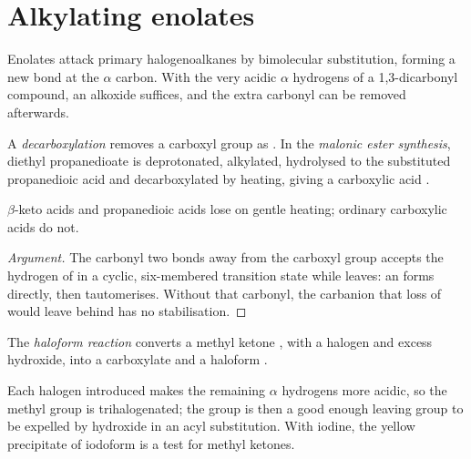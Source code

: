 \section{Alkylating enolates}

Enolates attack primary halogenoalkanes by bimolecular substitution, forming a new  bond at
the $\alpha$ carbon. With the very acidic $\alpha$ hydrogens of a 1,3-dicarbonyl compound, an alkoxide
suffices, and the extra carbonyl can be removed afterwards.

\begin{definition}[Decarboxylation]\label{def:b2:enolates-aldol:decarboxylation}
A \emph{decarboxylation} removes a carboxyl group as . In the
\emph{malonic ester synthesis}, diethyl propanedioate is deprotonated,
alkylated, hydrolysed to the substituted propanedioic acid and decarboxylated by heating, giving a
carboxylic acid .
\end{definition}

\begin{proposition}\label{prop:b2:enolates-aldol:decarboxylation}
$\beta$-keto acids and propanedioic acids lose  on gentle heating; ordinary carboxylic acids
do not.
\end{proposition}

\begin{proof}[Argument]
The carbonyl two bonds away from the carboxyl group accepts the hydrogen of  in a cyclic,
six-membered transition state while  leaves: an  forms directly, then tautomerises. Without
that carbonyl, the carbanion that loss of  would leave behind has no stabilisation.
\end{proof}

\begin{definition}\label{def:b2:enolates-aldol:haloform}
The \emph{haloform reaction} converts a methyl ketone , with a
halogen and excess hydroxide, into a carboxylate  and a haloform .
\end{definition}

Each halogen introduced makes the remaining $\alpha$ hydrogens more acidic, so the methyl group is
trihalogenated; the  group is then a good enough leaving group to be expelled by hydroxide in an
acyl substitution. With iodine, the yellow precipitate of iodoform is a test for methyl ketones.

